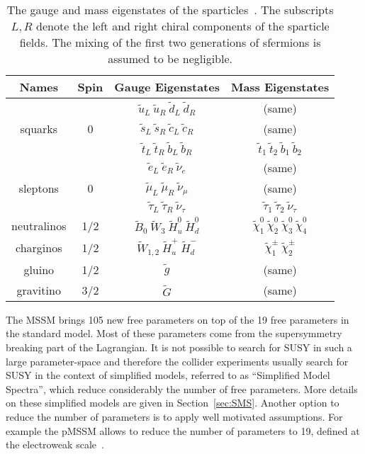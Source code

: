 \begin{table}[h]
\begin{center}
\begin{tabular}{|c|c|c|c|}
\hline
Names & Spin  & Gauge Eigenstates & Mass Eigenstates  \\
\hline
      \rule{0pt}{3ex}   &   & $\tilde{u}_{L}~\tilde{u}_{R}~\tilde{d}_{L}~\tilde{d}_{R}$  & (same) \\
squarks & 0 & $\tilde{s}_{L}~\tilde{s}_{R}~\tilde{c}_{L}~\tilde{c}_{R}$  & (same) \\
        &   & $\tilde{t}_{L}~\tilde{t}_{R}~\tilde{b}_{L}~\tilde{b}_{R}$  & $\tilde{t}_{1}~\tilde{t}_{2}~\tilde{b}_{1}~\tilde{b}_{2}$ \\
\hline
         &   & $\tilde{e}_{L}~\tilde{e}_{R}~\tilde{\nu}_{e}$  & (same) \\
sleptons & 0 & $\tilde{\mu}_{L}~\tilde{\mu}_{R}~\tilde{\nu}_{\mu}$  & (same) \\
         &   & $\tilde{\tau}_{L}~\tilde{\tau}_{R}~\tilde{\nu}_{\tau}$  & $\tilde{\tau}_{1}~\tilde{\tau}_{2}~\tilde{\nu}_{\tau}$ \\
\hline
neutralinos \rule{0pt}{3ex} & 1/2 & $\tilde{B}_{0}~\tilde{W}_{3}~\tilde{H}_{u}^{0}~\tilde{H}_{d}^{0}$  & $\tilde{\chi}_{1}^{0}~\tilde{\chi}_{2}^{0}~\tilde{\chi}_{3}^{0}~\tilde{\chi}_{4}^{0} $ \\
\hline
charginos  \rule{0pt}{3ex} & 1/2 & $\tilde{W}_{1,2}~\tilde{H}_{u}^{+}~\tilde{H}_{d}^{-}$  & $\tilde{\chi}_{1}^{\pm}~\tilde{\chi}_{2}^{\pm} $ \\
\hline 
gluino & 1/2 & $\tilde{g}$  & (same) \\
\hline
gravitino  \rule{0pt}{3ex} & 3/2 & $\tilde{G}$  & (same) \\
\hline
\end{tabular}
\caption[Table caption text]{The gauge and mass eigenstates of the sparticles~\cite{Martin:1997ns}. The subscripts $L,R$ denote the left and right chiral components of the sparticle fields. The mixing of the first two generations of sfermions is assumed to be negligible. }
\label{tab:SUSYspectrum}
\end{center}
\end{table}

The MSSM brings 105 new free parameters on top of the 19 free parameters in the standard model. Most of these parameters come from the supersymmetry breaking part of the Lagrangian. It is not possible to search for SUSY in such a large parameter-space and therefore the collider experiments usually search for SUSY in the context of simplified models, referred to as ``Simplified Model Spectra'', which reduce considerably the number of free parameters. More details on these simplified models are given in Section~\ref{sec:SMS}. Another option to reduce the number of parameters is to apply well motivated assumptions. For example the pMSSM allows to reduce the number of parameters to 19, defined at the electroweak scale~\cite{Berger:2008cq}.

